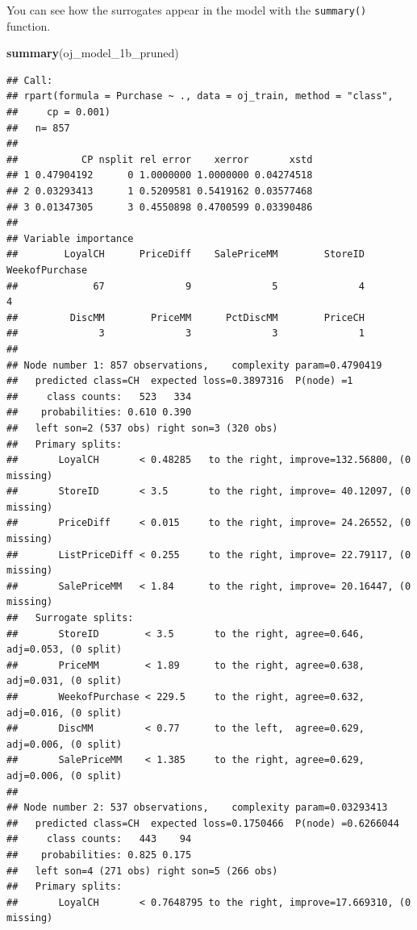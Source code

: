\documentclass[]{book}
\newenvironment{Shaded}{\begin{snugshade}}{\end{snugshade}}
\newcommand{\KeywordTok}[1]{\textcolor[rgb]{0.13,0.29,0.53}{\textbf{#1}}}
\newcommand{\NormalTok}[1]{#1}
\begin{document}
You can see how the surrogates appear in the model with the \texttt{summary()} function.

\begin{Shaded}
\begin{Highlighting}[]
\KeywordTok{summary}\NormalTok{(oj_model_1b_pruned)}
\end{Highlighting}
\end{Shaded}

\begin{verbatim}
## Call:
## rpart(formula = Purchase ~ ., data = oj_train, method = "class", 
##     cp = 0.001)
##   n= 857 
## 
##           CP nsplit rel error    xerror       xstd
## 1 0.47904192      0 1.0000000 1.0000000 0.04274518
## 2 0.03293413      1 0.5209581 0.5419162 0.03577468
## 3 0.01347305      3 0.4550898 0.4700599 0.03390486
## 
## Variable importance
##        LoyalCH      PriceDiff    SalePriceMM        StoreID WeekofPurchase 
##             67              9              5              4              4 
##         DiscMM        PriceMM      PctDiscMM        PriceCH 
##              3              3              3              1 
## 
## Node number 1: 857 observations,    complexity param=0.4790419
##   predicted class=CH  expected loss=0.3897316  P(node) =1
##     class counts:   523   334
##    probabilities: 0.610 0.390 
##   left son=2 (537 obs) right son=3 (320 obs)
##   Primary splits:
##       LoyalCH       < 0.48285   to the right, improve=132.56800, (0 missing)
##       StoreID       < 3.5       to the right, improve= 40.12097, (0 missing)
##       PriceDiff     < 0.015     to the right, improve= 24.26552, (0 missing)
##       ListPriceDiff < 0.255     to the right, improve= 22.79117, (0 missing)
##       SalePriceMM   < 1.84      to the right, improve= 20.16447, (0 missing)
##   Surrogate splits:
##       StoreID        < 3.5       to the right, agree=0.646, adj=0.053, (0 split)
##       PriceMM        < 1.89      to the right, agree=0.638, adj=0.031, (0 split)
##       WeekofPurchase < 229.5     to the right, agree=0.632, adj=0.016, (0 split)
##       DiscMM         < 0.77      to the left,  agree=0.629, adj=0.006, (0 split)
##       SalePriceMM    < 1.385     to the right, agree=0.629, adj=0.006, (0 split)
## 
## Node number 2: 537 observations,    complexity param=0.03293413
##   predicted class=CH  expected loss=0.1750466  P(node) =0.6266044
##     class counts:   443    94
##    probabilities: 0.825 0.175 
##   left son=4 (271 obs) right son=5 (266 obs)
##   Primary splits:
##       LoyalCH       < 0.7648795 to the right, improve=17.669310, (0 missing)

\end{verbatim}
\end{document}
